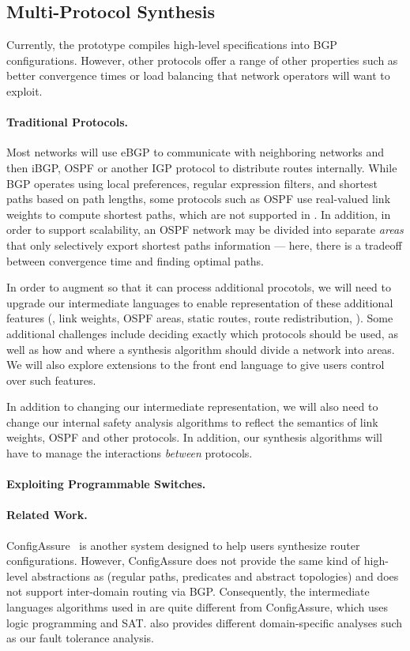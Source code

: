\subsection{Multi-Protocol Synthesis}

Currently, the \Name prototype compiles high-level specifications into BGP
configurations.  However, other protocols offer a range of other properties
such as better convergence times or load balancing that network operators 
will want to exploit.

\paragraph*{Traditional Protocols.}  Most networks will use
eBGP to communicate with neighboring networks and 
then iBGP, OSPF or another IGP protocol to distribute routes internally.
While BGP operates using local preferences, regular expression filters,
and shortest paths based on path lengths, some protocols such as OSPF
use real-valued link weights to compute shortest paths, which are not
supported in \Name.  In addition, in order to support scalability, 
an OSPF network may be divided into separate \emph{areas} that only selectively
export shortest paths information --- here, there is a tradeoff between 
convergence time and finding optimal paths.  

In order to
augment \Name so that it can process additional procotols, we will
need to upgrade our intermediate languages to enable representation 
of these additional features (\eg, link weights, OSPF areas, static routes,
route redistribution, \etc).  
Some additional challenges include deciding exactly which protocols should be used,
as well as how and where
a synthesis algorithm should divide a network into areas.  We will also
explore extensions to the \Name front end language to give users
control over such features.

In addition to changing our intermediate representation, we will also need to 
change our internal safety analysis algorithms to reflect the semantics of 
link weights, OSPF and other protocols.
In addition, our synthesis algorithms will have to manage the interactions
\emph{between} protocols.

\paragraph*{Exploiting Programmable Switches.}

\paragraph*{Related Work.}
ConfigAssure~\cite{narain:lisa05,narain+:configassure}  is another
system designed to help users synthesize
router configurations. However, ConfigAssure does not 
provide the same kind of high-level abstractions as \Name
(regular paths, predicates and abstract topologies) and does not
support inter-domain routing via BGP.  Consequently,
the intermediate languages algorithms used in \Name are quite
different from ConfigAssure, which uses logic programming and SAT.
\Name also provides different domain-specific analyses such as
our fault tolerance analysis.

